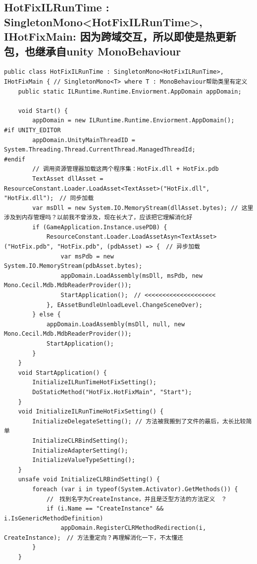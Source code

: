 \documentclass[9pt, b5paper]{article}
\begin{document}
\subsection{HotFixILRunTime : SingletonMono<HotFixILRunTime>, IHotFixMain: 因为跨域交互，所以即使是热更新包，也继承自unity MonoBehaviour}
\label{sec-5-6}
\begin{verbatim}
public class HotFixILRunTime : SingletonMono<HotFixILRunTime>, IHotFixMain { // SingletonMono<T> where T : MonoBehaviour帮助类里有定义
    public static ILRuntime.Runtime.Enviorment.AppDomain appDomain;

    void Start() {
        appDomain = new ILRuntime.Runtime.Enviorment.AppDomain();
#if UNITY_EDITOR
        appDomain.UnityMainThreadID = System.Threading.Thread.CurrentThread.ManagedThreadId;
#endif
        // 调用资源管理器加载这两个程序集：HotFix.dll + HotFix.pdb
        TextAsset dllAsset = ResourceConstant.Loader.LoadAsset<TextAsset>("HotFix.dll", "HotFix.dll");　// 同步加载
        var msDll = new System.IO.MemoryStream(dllAsset.bytes); // 这里涉及到内存管理吗？以前我不曾涉及，现在长大了，应该把它理解消化好
        if (GameApplication.Instance.usePDB) {
            ResourceConstant.Loader.LoadAssetAsyn<TextAsset>("HotFix.pdb", "HotFix.pdb", (pdbAsset) => {　// 异步加载
                var msPdb = new System.IO.MemoryStream(pdbAsset.bytes);
                appDomain.LoadAssembly(msDll, msPdb, new Mono.Cecil.Mdb.MdbReaderProvider());
                StartApplication();　// <<<<<<<<<<<<<<<<<<<< 
            }, EAssetBundleUnloadLevel.ChangeSceneOver);
        } else {
            appDomain.LoadAssembly(msDll, null, new Mono.Cecil.Mdb.MdbReaderProvider());
            StartApplication();
        }
    }
    void StartApplication() {
        InitializeILRunTimeHotFixSetting();
        DoStaticMethod("HotFix.HotFixMain", "Start");
    }
    void InitializeILRunTimeHotFixSetting() {
        InitializeDelegateSetting(); // 方法被我搬到了文件的最后，太长比较简单
        InitializeCLRBindSetting();
        InitializeAdapterSetting();
        InitializeValueTypeSetting();
    }
    unsafe void InitializeCLRBindSetting() {
        foreach (var i in typeof(System.Activator).GetMethods()) {
            //　找到名字为CreateInstance，并且是泛型方法的方法定义　？
            if (i.Name == "CreateInstance" && i.IsGenericMethodDefinition) 
                appDomain.RegisterCLRMethodRedirection(i, CreateInstance);　// 方法重定向？再理解消化一下，不太懂还
        }
    }


\end{verbatim}
\end{document}
